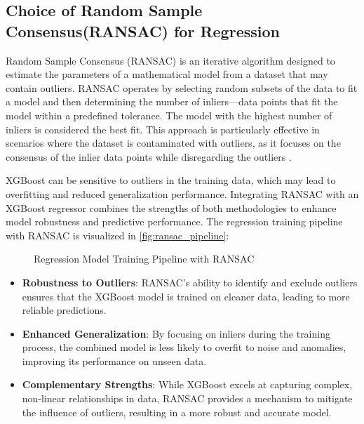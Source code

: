 \documentclass{iutbscthesis}
\begin{document}
\subsection{Choice of Random Sample Consensus(RANSAC) for Regression}

Random Sample Consensus (RANSAC) is an iterative algorithm designed to estimate the parameters of a mathematical model from a dataset that may contain outliers. RANSAC operates by selecting random subsets of the data to fit a model and then determining the number of inliers—data points that fit the model within a predefined tolerance. The model with the highest number of inliers is considered the best fit. This approach is particularly effective in scenarios where the dataset is contaminated with outliers, as it focuses on the consensus of the inlier data points while disregarding the outliers \cite{fischler1981random}.

 XGBoost can be sensitive to outliers in the training data, which may lead to overfitting and reduced generalization performance. Integrating RANSAC with an XGBoost regressor combines the strengths of both methodologies to enhance model robustness and predictive performance. The regression training pipeline with RANSAC is visualized in \autoref{fig:ransac_pipeline}:

\begin{figure}
    \centering
    
    \caption{Regression Model Training Pipeline with RANSAC}
    \label{fig:ransac_pipeline}
\end{figure}

\begin{itemize}
    \item \textbf{Robustness to Outliers}: RANSAC's ability to identify and exclude outliers ensures that the XGBoost model is trained on cleaner data, leading to more reliable predictions.

    \item \textbf{Enhanced Generalization}: By focusing on inliers during the training process, the combined model is less likely to overfit to noise and anomalies, improving its performance on unseen data.

    \item \textbf{Complementary Strengths}: While XGBoost excels at capturing complex, non-linear relationships in data, RANSAC provides a mechanism to mitigate the influence of outliers, resulting in a more robust and accurate model.
\end{itemize}
\end{document}
